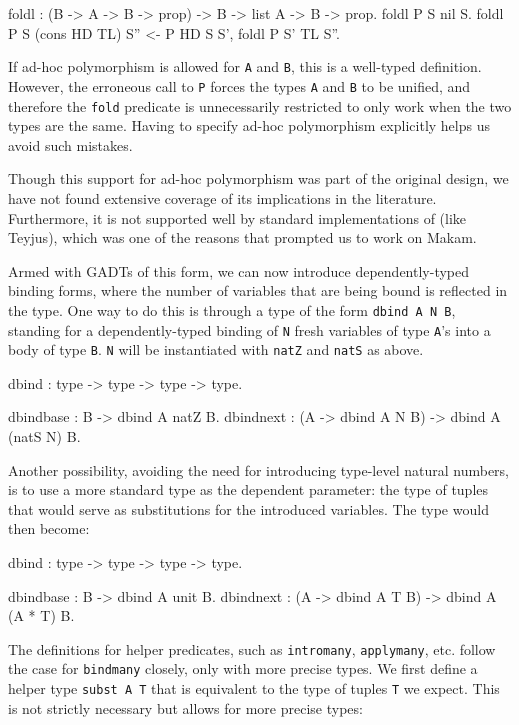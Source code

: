 \documentclass[format=acmlarge,review,anonymous]{acmart}\settopmatter{printfolios=true}
\begin{document}
\begin{codequote}
foldl : (B -> A -> B -> prop) -> B -> list A -> B -> prop.
foldl P S nil S.
foldl P S (cons HD TL) S'' <- P HD S S', foldl P S' TL S''.
\end{codequote}

If ad-hoc polymorphism is allowed for \texttt{A} and \texttt{B}, this is a well-typed
definition. However, the erroneous call to \texttt{P} forces the types \texttt{A} and \texttt{B} to
be unified, and therefore the \texttt{fold} predicate is unnecessarily restricted to only work when
the two types are the same. Having to specify ad-hoc polymorphism explicitly helps us avoid such
mistakes.

Though this support for ad-hoc polymorphism was part of the original \lamprolog design, we have not
found extensive coverage of its implications in the literature. Furthermore, it is not supported
well by standard implementations of \lamprolog (like Teyjus), which was one of the reasons that
prompted us to work on Makam.

Armed with GADTs of this form, we can now introduce dependently-typed binding forms, where the
number of variables that are being bound is reflected in the type. One way to do this is through a
type of the form \texttt{dbind A N B}, standing for a dependently-typed binding of \texttt{N} fresh
variables of type \texttt{A}'s into a body of type \texttt{B}. \texttt{N} will be instantiated with
\texttt{natZ} and \texttt{natS} as above.

\begin{codequote}
dbind : type -> type -> type -> type. 

dbindbase : B -> dbind A natZ B.
dbindnext : (A -> dbind A N B) -> dbind A (natS N) B.
\end{codequote}

Another possibility, avoiding the need for introducing type-level natural numbers, is to use a more
standard type as the dependent parameter: the type of tuples that would serve as substitutions for
the introduced variables. The type would then become:

\begin{codequote}
dbind : type -> type -> type -> type.

dbindbase : B -> dbind A unit B.
dbindnext : (A -> dbind A T B) -> dbind A (A * T) B.
\end{codequote}

The definitions for helper predicates, such as \texttt{intromany}, \texttt{applymany}, etc. follow
the case for \texttt{bindmany} closely, only with more precise types. We first define a helper type
\texttt{subst A T} that is equivalent to the type of tuples \texttt{T} we expect. This is not
strictly necessary but allows for more precise types:
\end{document}
